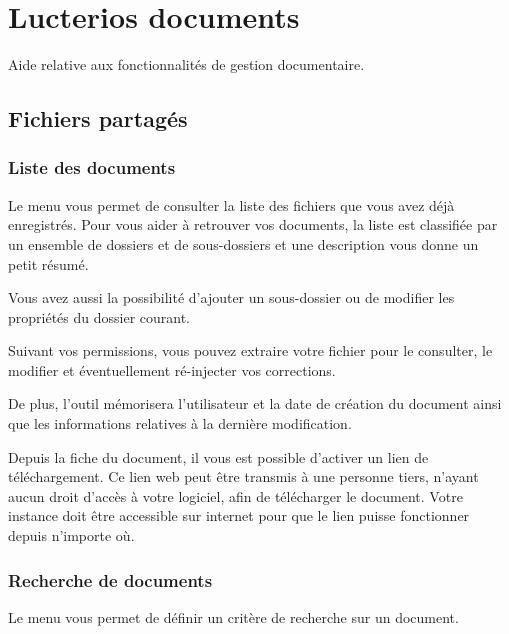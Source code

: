 \documentclass[a4paper,10pt,oneside,french]{sphinxmanual}
\begin{document}
\chapter{Lucterios documents}
\label{\detokenize{documents/index:lucterios-documents}}\label{\detokenize{documents/index::doc}}
Aide relative aux fonctionnalités de gestion documentaire.


\section{Fichiers partagés}
\label{\detokenize{documents/shared_document:fichiers-partages}}\label{\detokenize{documents/shared_document::doc}}

\subsection{Liste des documents}
\label{\detokenize{documents/shared_document:liste-des-documents}}
Le menu  vous permet de consulter la liste des fichiers que vous avez déjà enregistrés. Pour vous aider à retrouver vos documents, la liste est classifiée par un ensemble de dossiers et de sous-dossiers et une description vous donne un petit résumé.

Vous avez aussi la possibilité d’ajouter un sous-dossier ou de modifier les propriétés du dossier courant.

\noindent{}

Suivant vos permissions, vous pouvez extraire votre fichier pour le consulter, le modifier et éventuellement ré-injecter vos corrections.

De plus, l’outil mémorisera l’utilisateur et la date de création du document ainsi que les informations relatives à la dernière modification.

\noindent{}

Depuis la fiche du document, il vous est possible d’activer un lien de téléchargement.
Ce lien web peut être transmis à une personne tiers, n’ayant aucun droit d’accès à votre logiciel, afin de télécharger le document.
 Votre instance doit être accessible sur internet pour que le lien puisse fonctionner depuis n’importe où.


\subsection{Recherche de documents}
\label{\detokenize{documents/shared_document:recherche-de-documents}}
Le menu  vous permet de définir un critère de recherche sur un document.
\end{document}
